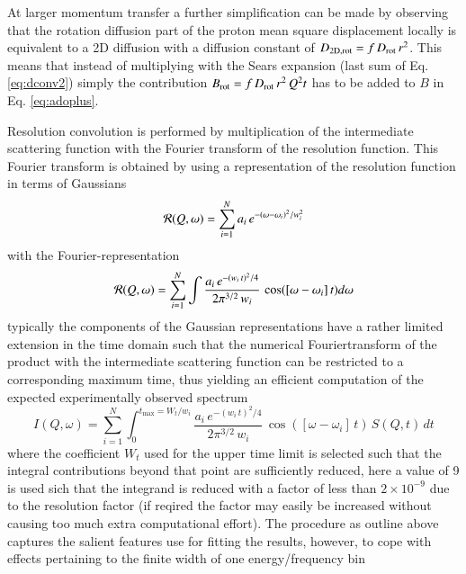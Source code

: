 \documentclass{jpsj-suppl}
\begin{document}
{{At larger momentum transfer a further simplification can be made by observing that the rotation diffusion
part of the proton mean square displacement locally is equivalent to a 2D diffusion with a diffusion
constant of $D_{\rm 2D,rot} = f\,D_{\rm rot} \, r^2$. This means that instead of multiplying with the
Sears expansion (last sum of Eq. \ref{eq:dconv2}) simply the contribution
$B_{\rm rot} =  f\,D_{\rm rot} \, r^2 \, Q^2 t$ has to be added to $B$ in Eq. \ref{eq:adoplus}.

}}


Resolution convolution is performed by multiplication of the intermediate scattering function with the
Fourier transform of the resolution function. This Fourier transform is obtained by using a representation 
of the resolution function in terms of Gaussians
\begin{equation}
\label{eg:gares}
{\cal R}(Q,\omega) = \sum_{i=1}^{N} { a_i \, e^{-(\omega-\omega_i)^2/w_i^2} }
\end{equation}
with the Fourier-representation
\begin{equation}
\label{eg:garesF}
{\cal R}(Q,\omega) = \sum_{i=1}^{N} {\int \frac{a_i \, e^{-(w_i \, t)^2/4}}{ 2 \pi^{3/2} \, w_i }\, \cos([\omega-\omega_i]\,t) d\omega}
\end{equation}
typically the components of the Gaussian representations have a rather limited extension in
the time domain such that the numerical Fouriertransform of the product with the intermediate
scattering function can be restricted to a corresponding maximum time, thus yielding an 
efficient computation of the expected experimentally observed spectrum
\begin{equation}
\label{eq:conv1}
I(Q,\omega) = \sum_{i=1}^{N} { \int_0^{t_{\max} = W_t/w_i} {
\frac{a_i \, e^{-(w_i \, t)^2/4}}{ 2 \pi^{3/2} \, w_i } \, \cos([\omega-\omega_i]\, t) \, S(Q,t) \, dt 
}}
\end{equation}
where the coefficient $W_t$ used for the upper time limit is selected such that the integral
contributions beyond that point are sufficiently reduced, 
here a value of 9 is used sich that the integrand is reduced with a factor of less than $2 \times 10^{-9}$ 
due to the resolution
factor (if reqired the factor may easily be increased without causing too much extra computational effort). 
The procedure as outline above captures the salient features use for fitting the results,
however, to cope with effects pertaining to the finite width of one energy/frequency bin
\end{document}
